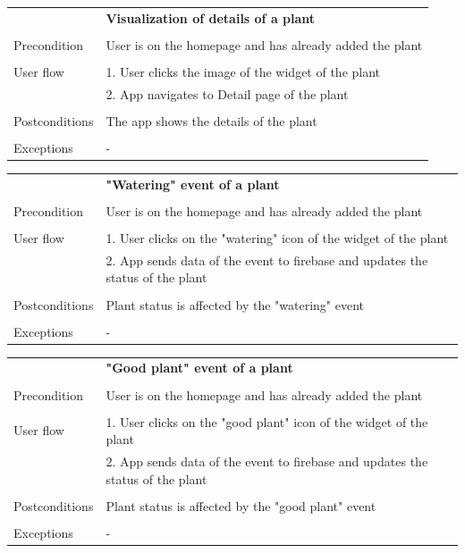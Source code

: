 \documentclass[10pt]{article}
\begin{document}
    \newline
    \newline
    \newline
    \begin{tabular}{ p{3cm}|p{8cm} }
     & \textbf{Visualization of details of a plant} \\
     \\
     Precondition & User is on the homepage and has already added the plant \\ 
     \\
     User flow 
     & 1. User clicks the image of the widget of the plant \\
     & 2. App navigates to Detail page of the plant \\ 
     \\
     Postconditions & The app shows the details of the plant \\
     \\
     Exceptions & -\\
    \end{tabular}
    \newline
    \newline
    \newline
    \begin{tabular}{ p{3cm}|p{8cm} }
     & \textbf{"Watering" event of a plant} \\
     \\
     Precondition & User is on the homepage and has already added the plant \\ 
     \\
     User flow 
     & 1. User clicks on the "watering" icon of the widget of the plant \\
     & 2. App sends data of the event to firebase and updates the status of the plant \\ 
     \\
     Postconditions & Plant status is affected by the "watering" event \\
     \\
     Exceptions & -\\
    \end{tabular}
    \newline
    \newline
    \newline
    \begin{tabular}{ p{3cm}|p{8cm} }
     & \textbf{"Good plant" event of a plant} \\
     \\
     Precondition & User is on the homepage and has already added the plant \\ 
     \\
     User flow 
     & 1. User clicks on the "good plant" icon of the widget of the plant \\
     & 2. App sends data of the event to firebase and updates the status of the plant \\ 
     \\
     Postconditions & Plant status is affected by the "good plant" event \\
     \\
     Exceptions & -\\
    \end{tabular}
\end{document}
